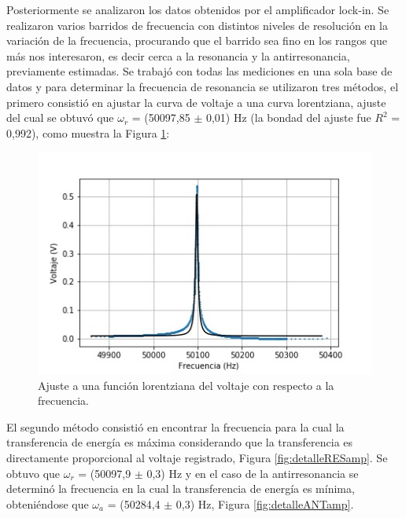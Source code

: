 \documentclass[twoside,twocolumn,a4paper]{article}
\begin{document}
\par
Posteriormente se analizaron los datos obtenidos por el amplificador lock-in. Se realizaron varios barridos de frecuencia con distintos niveles de resoluci\'on en la variaci\'on de la frecuencia, procurando que el barrido sea fino en los rangos que m\'as nos interesaron, es decir cerca a la resonancia y la antirresonancia, previamente estimadas. Se trabaj\'o con todas las mediciones en una sola base de datos y para determinar la frecuencia de resonancia se utilizaron tres m\'etodos, el primero consisti\'o en ajustar la curva de voltaje a una curva lorentziana, ajuste del cual se obtuv\'o que $\omega_{r}$ = (50097,85 $\pm$ 0,01) Hz (la bondad del ajuste fue $R^{2}$ = 0,992), como muestra la Figura \ref{fig:ajuste}:


\begin{figure}[H]
\includegraphics[width=\linewidth]{ajuste.jpg}
\caption{Ajuste a una funci\'on lorentziana del voltaje con respecto a la frecuencia.}
\label{fig:ajuste}
\end{figure}


El segundo m\'etodo consisti\'o en encontrar la frecuencia para la cual la transferencia de energ\'ia es m\'axima considerando que la transferencia es directamente proporcional al voltaje registrado,  Figura \ref{fig:detalleRESamp}. Se obtuvo que $\omega_{r}$ = (50097,9 $\pm$ 0,3) Hz y en el caso de la antirresonancia se determin\'o la frecuencia en la cual la transferencia de energ\'ia es m\'inima, obteni\'endose que $\omega_{a}$ = (50284,4 $\pm$ 0,3) Hz, Figura \ref{fig:detalleANTamp}.
\end{document}
